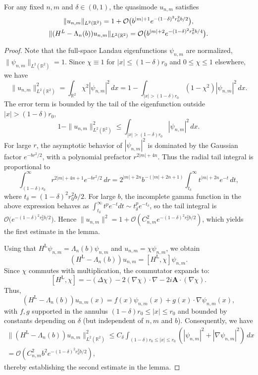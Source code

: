 \documentclass[10pt,a4paper]{amsart}
\newcommand{\R}{\mathbb{R}}
\newcommand{\bA}{\mathbf{A}}
\begin{document}
\begin{lemma}\label{lem:quasimode}
For any fixed $n,m$ and $\delta \in (0,1)$, the quasimode $u_{n,m}$ satisfies
\[\begin{gathered}
    \|u_{n,m}\|_{L^2(\R^2)} = 1 + \mathcal O\big( b^{|m|+1}e^{- (1-\delta)^2 r_0^2b/2} \big) ,\\
    \|(H^{\rm L}-\Lambda_n(b))u_{n,m}\|_{L^2(\R^2)} = \mathcal O\big(b^{|m|+2} e^{- (1-\delta)^2 r_0^2b/4} \big).
\end{gathered}
\]
\end{lemma}

\begin{proof}
Note that the full-space Landau eigenfunctions $\psi_{n,m}$ are normalized,
$\|\psi_{n,m}\|_{L^2(\mathbb{R}^2)} = 1$.  
Since $\chi \equiv 1$ for $|x| \le (1-\delta)r_0$ and $0 \le \chi \le 1$ elsewhere, we have  
\[
\|u_{n,m}\|^2_{L^2(\R^2)} = \int_{\mathbb{R}^2} \chi^2 |\psi_{n,m}|^2 \, dx 
= 1 - \int_{|x| > (1-\delta)r_0} (1-\chi^2) |\psi_{n,m}|^2 \, dx.
\]  
The error term is bounded by the tail of the eigenfunction outside $|x| > (1-\delta)r_0$,
\[
1 - \|u_{n,m}\|^2_{L^2(\R^2)} \le \int_{|x| > (1-\delta)r_0} |\psi_{n,m}|^2 \, dx.
\]  
For large $r$, the asymptotic behavior of $|\psi_{n,m}|^2$ is dominated by the Gaussian factor $e^{-b r^2/2}$, with a polynomial prefactor $r^{2|m|+4n}$.  
Thus the radial tail integral is proportional to  
\[
\int_{(1-\delta)r_0}^\infty r^{2|m|+4n+1} e^{-b r^2/2} \, dr
= 2^{|m|+2n} b^{-(|m|+2n+1)} \int_{t_\delta}^\infty t^{|m|+2n} e^{-t} \, dt,
\]  
where $t_\delta =  (1-\delta)^2 r_0^2b / 2$.  
For large $b$, the incomplete gamma function  in the above expression
 behaves as $\int_{t_\delta}^\infty t^p e^{-t} dt \sim t_\delta^p e^{-t_\delta}$, so the tail integral is $\mathcal{O}\big( e^{-(1-\delta)^2 r_0^2b/2} \big)$.  
Hence $\|u_{n,m}\|^2 = 1 + \mathcal{O}(C_{n,m}^2e^{- (1-\delta)^2 r_0^2b/2})$, which yields the first estimate in the lemma.\medskip

Using that $H^{\text{L}}\psi_{n,m} = \Lambda_n(b)\psi_{n,m}$ and $u_{n,m} = \chi \psi_{n,m}$, we obtain
\[
(H^{\text{L}}-\Lambda_n(b))u_{n,m} = [H^{\text{L}}, \chi] \psi_{n,m}.
\]
Since $\chi$ commutes with multiplication, the commutator expands to:
\[
[H^{\text{L}}, \chi] = -(\Delta \chi) - 2(\nabla \chi) \cdot \nabla - 2i\bA \cdot (\nabla \chi).
\]
Thus,
\[
(H^{\text{L}}-\Lambda_n(b))u_{n,m}(x) = f(x) \psi_{n,m}(x) + g(x) \cdot \nabla \psi_{n,m}(x),
\]
with $f,g$ supported in the annulus $(1-\delta)r_0 \le |x| \le r_0$ and bounded by constants depending on $\delta$ (but independent of $n,m$ and $b$). Consequently, we have
\begin{multline*}
\|(H^{\text{L}}-\Lambda_n(b))u_{n,m}\|_{L^2(\R^2)}^2 \le C_\delta\int_{(1-\delta)r_0 \le |x| \le r_0} (|\psi_{n,m}|^2 + |\nabla \psi_{n,m}|^2) \, dx\\
=\mathcal O(C_{n,m}^2b^2e^{-(1-\delta)^2r_0^2b/2}),
\end{multline*}
thereby establishing the second estimate in the lemma.
\end{proof}
\end{document}
